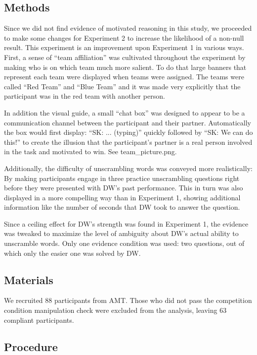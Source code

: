 \documentclass{article}
\begin{document}
\subsection{Methods}
Since we did not find evidence of motivated reasoning in this study, we proceeded to make some changes for Experiment 2 to increase the likelihood of a non-null result. This experiment is an improvement upon Experiment 1 in various ways. First, a sense of ``team affiliation'' was cultivated throughout the experiment by making who is on which team much more salient. To do that large banners that represent each team were displayed when teams were assigned. The teams were called ``Red Team'' and ``Blue Team'' and it was made very explicitly that the participant was in the red team with another person. 

In addition the visual guide, a small ``chat box'' was designed to appear to be a communication channel between the participant and their partner. Automatically the box would first display: ``SK: ... (typing)'' quickly followed by ``SK: We can do this!'' to create the illusion that the participant's partner is a real person involved in the task and motivated to win. See team\_picture.png.

Additionally, the difficulty of unscrambling words was conveyed more realistically: By making participants engage in three practice unscrambling questions right before they were presented with DW's past performance. This in turn was also displayed in a more compelling way than in Experiment 1, showing additional information like the number of seconds that DW took to answer the question.

Since a ceiling effect for DW's strength was found in Experiment 1, the evidence was tweaked to maximize the level of ambiguity about DW's actual ability to unscramble words. Only one evidence condition was used: two questions, out of which only the easier one was solved by DW.

\subsection{Materials}

We recruited 88 participants from AMT. Those who did not pass the competition condition manipulation check were excluded from the analysis, leaving 63 compliant participants.

\subsection{Procedure}
\end{document}
